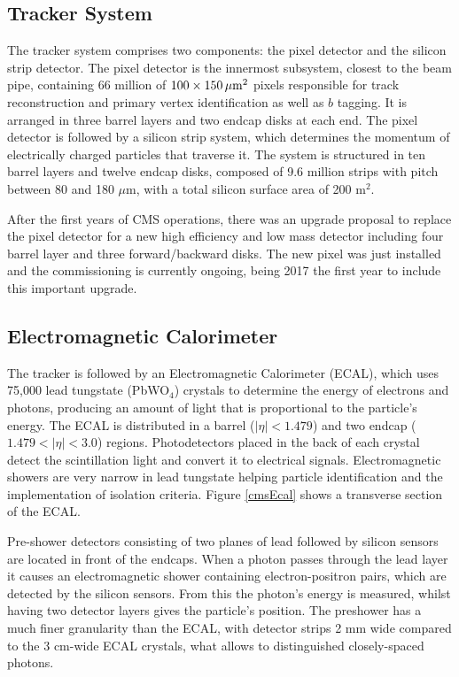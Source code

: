 \subsection{Tracker System}
The tracker system comprises two components: the pixel detector and the silicon strip detector. The pixel detector is the innermost subsystem, closest to the beam pipe, containing 66 million of $100\times150\,\mu {\rm m}^2$ pixels responsible for track reconstruction and primary vertex identification as well as $b$ tagging. It is arranged in three barrel layers and two endcap disks at each end. The pixel detector is followed by a silicon strip system, which determines the momentum of electrically charged particles that traverse it. The system is structured in ten barrel layers and twelve endcap disks, composed of 9.6 million strips with pitch between 80 and 180 $\mu$m, with a total silicon surface area of 200 m$^2$. 

After the first years of CMS operations, there was an upgrade proposal \cite{Dominguez:1481838} to replace the pixel detector for a new high efficiency and low mass detector including four barrel layer and three forward/backward disks. The new pixel was just installed and the commissioning is currently ongoing, being 2017 the first year to include this important upgrade.  

\subsection{Electromagnetic Calorimeter}
The tracker is followed by an Electromagnetic Calorimeter (ECAL), which uses 75,000 lead tungstate (PbWO$_4$) crystals to determine the energy of electrons and photons, producing an amount of light that is proportional to the particle's energy. The ECAL is distributed in a barrel ($|\eta| < 1.479$) and two endcap ($1.479 < |\eta| <3.0$) regions. Photodetectors placed in the back of each crystal detect the scintillation light and convert it to electrical signals. Electromagnetic showers are very narrow in lead tungstate helping particle identification and the implementation of isolation criteria. Figure \ref{cmsEcal} shows a transverse section of the ECAL. 

Pre-shower detectors consisting of two planes of lead followed by silicon sensors are located in front of the endcaps. When a photon passes through the lead layer it causes an electromagnetic shower containing electron-positron pairs, which are detected by the silicon sensors. From this the photon's energy is measured, whilst having two detector layers gives the particle's position. The preshower has a much finer granularity than the ECAL, with detector strips 2 mm wide compared to the 3 cm-wide ECAL crystals, what allows to distinguished closely-spaced photons. 

